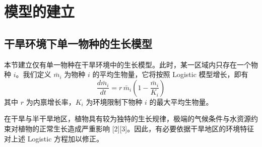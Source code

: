 \documentclass[11pt,a4paper]{ctexart}
\begin{document}
\section{模型的建立}

\subsection{干旱环境下单一物种的生长模型}

本节建立仅有单一物种在干旱环境中的生长模型。此时，某一区域内只存在一个物种 $i$。我们定义 $\bar m_i$ 为物种 $i$ 的平均生物量，它将按照 Logistic 模型增长，即有
\[
\frac{d\bar m_i}{dt}=r\,\bar m_i\left(1-\frac{\bar m_i}{K_i}\right)
\]
其中 $r$ 为内禀增长率，$K_i$ 为环境限制下物种 $i$ 的最大平均生物量。

在干旱与半干旱地区，植物具有较为独特的生长规律，极端的气候条件与水资源约束对植物的正常生长造成严重影响 [2][3]。因此，有必要依据干旱地区的环境特征对上述 Logistic 方程加以修正。
\end{document}
